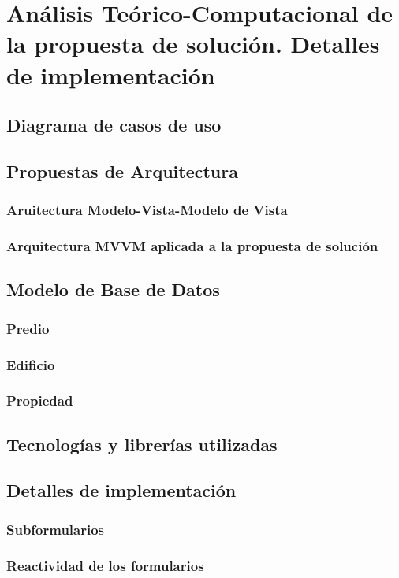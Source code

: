 \chapter{Análisis Teórico-Computacional de la propuesta de solución. Detalles de implementación}\label{chapter:proposal}

\section{Diagrama de casos de uso}
\section{Propuestas de Arquitectura}
\subsection{Aruitectura Modelo-Vista-Modelo de Vista}
\subsection{Arquitectura MVVM aplicada a la propuesta de solución}
\section{Modelo de Base de Datos}
\subsection{Predio}
\subsection{Edificio}
\subsection{Propiedad}
\section{Tecnologías y librerías utilizadas}
\section{Detalles de implementación}
\subsection{Subformularios }
\subsection{Reactividad de los formularios}
